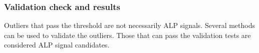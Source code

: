 


\subsubsection{Validation check and results}

Outliers that pass the threshold are not necessarily ALP signals.
Several methods can be used to validate the outliers. 
Those that can pass the validation tests are considered ALP signal candidates.

